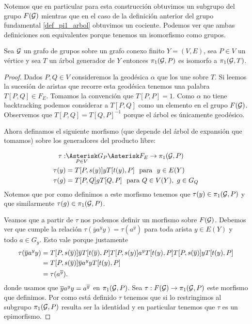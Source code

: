 \documentclass[tesis.tex]{subfiles}
\begin{document}
Notemos que en particular para esta construcción obtuvimos un subgrupo del grupo $F(\cal G)$ mientras que en el caso de la definición anterior del grupo fundamental \ref{def_pi1_arbol} obtuvimos un cociente.
Podemos ver que ambas definiciones son equivalentes porque tenemos un isomorfismo como grupos.

\begin{teo}\label{teo_grp_fund_iso}
	Sea ${\cal G}$ un grafo de grupos sobre un grafo conexo finito $Y = (V,E)$, sea $P \in V$ un vértice y sea $T$ un árbol generador de $Y$ entonces $\pi_1({\cal G}, P)$ es isomorfo a $\pi_1({\cal G}, T)$.
\end{teo}
\begin{proof}
	Dados $P,Q \in V$ consideremos la geodésica $\alpha$ que los une sobre $T$.
	Si leemos la sucesión de aristas que recorre esta geodésica tenemos una palabra $T[P,Q] \in F_{E}$. 
	Tomamos la convención que $T[P,P] = 1$.
	Como $\alpha$ no tiene backtracking podemos considerar a $T[P,Q]$ como un elemento en el grupo $F({\cal G})$.
	Observemos que $T[P,Q] = T[Q,P]^{-1}$ porque el árbol es únicamente geodésico.
	
	Ahora definamos el siguiente morfismo (que depende del árbol de expansión que tomamos) sobre los generadores del producto libre:
	
	\begin{align*}
		\tau: & \underset{P \in V}{\Asterisk} G_P \Asterisk F_{E} \to \pi_1(\cG,P)  \\
		 \tau(y) &= T[P,s(y)]yT[t(y),P] \ \ \text{para } \ y\in E(Y) \\
		\tau(g) &= T[P,Q] g T[Q,P] \ \  \text{para} \ Q \in V(Y), \ g \in G_Q
	\end{align*}
	Notemos que por como definimos a este morfismo tenemos que $\tau(y) \in \pi_1({\cal G},P)$ y que similarmente $\tau(g) \in \pi_1({\cal G},P)$.
	

	Veamos que a partir de $\tau$ nos podemos definir un morfismo sobre $F({\cal G})$.
	Debemos ver que cumple la relación $\tau(\overline y a^y y) = \tau (a^{\overline y})$ para toda arista $y \in E(Y)$ y todo $a \in G_y$.
	Esto vale porque justamente 
	\begin{align*}
		\tau(\overline y a^y y) & = T[P,s(\overline y)]\overline yT[t(\overline y),P] T[P,s(y)] a^y T[t(y),P] T[P,s(\overline y)]yT[t( y),P] \\
		& = T[P,s(\overline y)]  \overline y a^y y T[t( y),P] \\
		& = \tau (a^{\overline y}).
	\end{align*}
	donde usamos que $\overline y a^y y = a^{\overline y}$ en $\pi_1({\cal G},P)$.
	Sea $\tau: F({\cal G}) \to \pi_1({\cal G}, P)$ este morfismo que definimos.
	Por como está definido $\tau$ tenemos que si lo restringimos al subgrupo  $\pi_1({\cal G},P)$ resulta ser la identidad y en particular tenemos que $\tau$ es un epimorfismo.
	

\end{proof}
\end{document}
